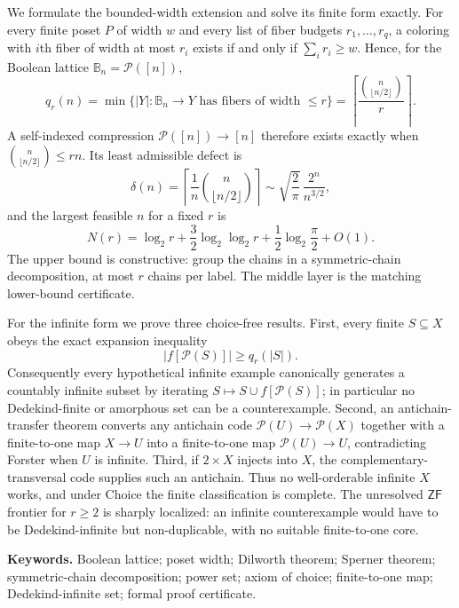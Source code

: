 \documentclass[11pt,letterpaper]{article}
\numberwithin{equation}{section}
\theoremstyle{plain}
\theoremstyle{definition}
\theoremstyle{remark}
\newcommand{\Pow}{\mathcal P}
\newcommand{\B}{\mathbb B}
\newcommand{\ZF}{\mathsf{ZF}}
\begin{document}
We formulate the bounded-width extension and solve its finite form exactly.
For every finite poset $P$ of width $w$ and every list of fiber budgets
$r_1,\dots,r_q$, a coloring with $i$th fiber of width at most $r_i$ exists if
and only if $\sum_i r_i\geq w$.  Hence, for the Boolean lattice
$\B_n=\Pow([n])$,
\[
 q_r(n)=\min\{|Y|:\B_n\to Y\text{ has fibers of width }\leq r\}
       =\left\lceil\frac{\binom n{\lfloor n/2\rfloor}}{r}\right\rceil.
\]
A self-indexed compression $\Pow([n])\to[n]$ therefore exists exactly when
$\binom n{\lfloor n/2\rfloor}\leq rn$.  Its least admissible defect is
\[
 \delta(n)=\left\lceil\frac1n\binom n{\lfloor n/2\rfloor}\right\rceil
 \sim \sqrt{\frac2\pi}\,\frac{2^n}{n^{3/2}},
\]
and the largest feasible $n$ for a fixed $r$ is
\[
 N(r)=\log_2 r+\frac32\log_2\log_2 r
       +\frac12\log_2\!\frac\pi2+O(1).
\]
The upper bound is constructive: group the chains in a symmetric-chain
decomposition, at most $r$ chains per label.  The middle layer is the matching
lower-bound certificate.

For the infinite form we prove three choice-free results.  First, every finite
$S\subseteq X$ obeys the exact expansion inequality
\[
 |f[\Pow(S)]|\geq q_r(|S|).
\]
Consequently every hypothetical infinite example canonically generates a
countably infinite subset by iterating $S\mapsto S\cup f[\Pow(S)]$; in
particular no Dedekind-finite or amorphous set can be a counterexample.
Second, an antichain-transfer theorem converts any antichain code
$\Pow(U)\to\Pow(X)$ together with a finite-to-one map $X\to U$ into a
finite-to-one map $\Pow(U)\to U$, contradicting Forster when $U$ is infinite.
Third, if $2\times X$ injects into $X$, the complementary-transversal code
supplies such an antichain.  Thus no well-orderable infinite $X$ works, and
under Choice the finite classification is complete.  The unresolved $\ZF$
frontier for $r\geq2$ is sharply localized: an infinite counterexample would
have to be Dedekind-infinite but non-duplicable, with no suitable
finite-to-one core.

\vspace{0.12in}
\noindent\textbf{Keywords.} Boolean lattice; poset width; Dilworth theorem; Sperner theorem; symmetric-chain decomposition; power set; axiom of choice; finite-to-one map; Dedekind-infinite set; formal proof certificate.
\end{document}

